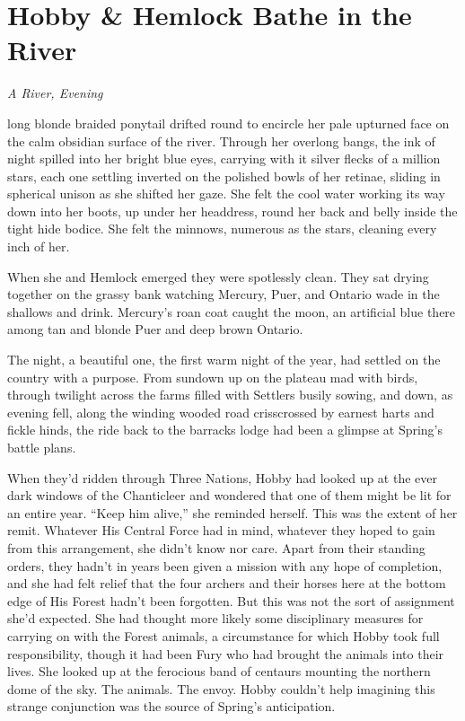 \documentclass[11pt,a5paper]{article}
\newcommand{\alet}[1]{\textit{#1}\vspace{1em}}
\begin{document}
\newpage

\section{Hobby \& Hemlock Bathe in the River}

\alet{A River, Evening}

 long blonde braided ponytail drifted round to encircle her pale upturned face on the calm obsidian surface of the river. Through her overlong bangs, the ink of night spilled into her bright blue eyes, carrying with it silver flecks of a million stars, each one settling inverted on the polished bowls of her retinae, sliding in spherical unison as she shifted her gaze. She felt the cool water working its way down into her boots, up under her headdress, round her back and belly inside the tight hide bodice. She felt the minnows, numerous as the stars, cleaning every inch of her.

When she and Hemlock emerged they were spotlessly clean. They sat drying together on the grassy bank watching Mercury, Puer, and Ontario wade in the shallows and drink. Mercury's roan coat caught the moon, an artificial blue there among tan and blonde Puer and deep brown Ontario.

The night, a beautiful one, the first warm night of the year, had settled on the country with a purpose. From sundown up on the plateau mad with birds, through twilight across the farms filled with Settlers busily sowing, and down, as evening fell, along the winding wooded road crisscrossed by earnest harts and fickle hinds, the ride back to the barracks lodge had been a glimpse at Spring's battle plans.

When they'd ridden through Three Nations, Hobby had looked up at the ever dark windows of the Chanticleer and wondered that one of them might be lit for an entire year. ``Keep him alive,'' she reminded herself. This was the extent of her remit. Whatever His Central Force had in mind, whatever they hoped to gain from this arrangement, she didn't know nor care. Apart from their standing orders, they hadn't in years been given a mission with any hope of completion, and she had felt relief that the four archers and their horses here at the bottom edge of His Forest hadn't been forgotten. But this was not the sort of assignment she'd expected. She had thought more likely some disciplinary measures for carrying on with the Forest animals, a circumstance for which Hobby took full responsibility, though it had been Fury who had brought the animals into their lives. She looked up at the ferocious band of centaurs mounting the northern dome of the sky. The animals. The envoy. Hobby couldn't help imagining this strange conjunction was the source of Spring's anticipation.
\end{document}
